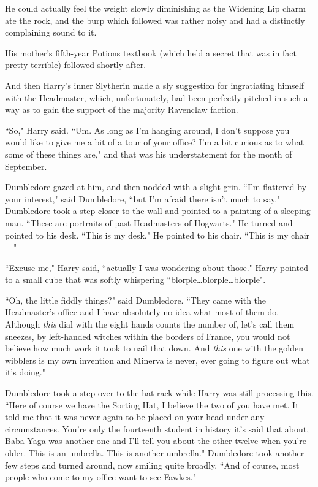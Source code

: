 He could actually feel the weight slowly diminishing as the Widening Lip charm ate the rock, and the burp which followed was rather noisy and had a distinctly complaining sound to it.

His mother's fifth-year Potions textbook (which held a secret that was in fact pretty terrible) followed shortly after.

And then Harry's inner Slytherin made a sly suggestion for ingratiating himself with the Headmaster, which, unfortunately, had been perfectly pitched in such a way as to gain the support of the majority Ravenclaw faction.

``So," Harry said. ``Um. As long as I'm hanging around, I don't suppose you would like to give me a bit of a tour of your office? I'm a bit curious as to what some of these things are," and that was his understatement for the month of September.

Dumbledore gazed at him, and then nodded with a slight grin. ``I'm flattered by your interest," said Dumbledore, ``but I'm afraid there isn't much to say." Dumbledore took a step closer to the wall and pointed to a painting of a sleeping man. ``These are portraits of past Headmasters of Hogwarts." He turned and pointed to his desk. ``This is my desk." He pointed to his chair. ``This is my chair—"

``Excuse me," Harry said, ``actually I was wondering about those." Harry pointed to a small cube that was softly whispering ``blorple…blorple…blorple".

``Oh, the little fiddly things?" said Dumbledore. ``They came with the Headmaster's office and I have absolutely no idea what most of them do. Although \emph{this} dial with the eight hands counts the number of, let's call them sneezes, by left-handed witches within the borders of France, you would not believe how much work it took to nail that down. And \emph{this} one with the golden wibblers is my own invention and Minerva is never, ever going to figure out what it's doing."

Dumbledore took a step over to the hat rack while Harry was still processing this. ``Here of course we have the Sorting Hat, I believe the two of you have met. It told me that it was never again to be placed on your head under any circumstances. You're only the fourteenth student in history it's said that about, Baba Yaga was another one and I'll tell you about the other twelve when you're older. This is an umbrella. This is another umbrella." Dumbledore took another few steps and turned around, now smiling quite broadly. ``And of course, most people who come to my office want to see Fawkes."

